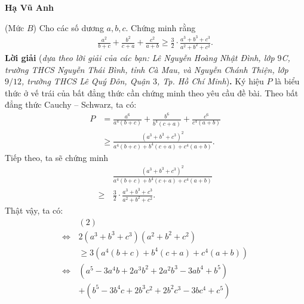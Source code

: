 \begin{multicols}{2}
	\begin{flushright}
		\textbf{\color{thachthuctoanhoc}Hạ Vũ Anh}
	\end{flushright}
	{}
	(Mức $B$) Cho các số dương $a, b, c$. Chứng minh rằng
	\begin{align*}
		\frac{{{a^2}}}{{b + c}} + \frac{{{b^2}}}{{c + a}} + \frac{{{c^2}}}{{a + b}} \ge \frac{3}{2} \cdot \frac{{{a^3} + {b^3} + {c^3}}}{{{a^2} + {b^2} + {c^2}}}.
	\end{align*}
	\textbf{\color{thachthuctoanhoc}Lời giải} (\textit{dựa theo lời giải của các bạn: Lê Nguyễn Hoàng Nhật Đình, lớp $9$C, trường THCS Nguyễn Thái Bình, tỉnh Cà Mau, và Nguyễn Chánh Thiện, lớp $9/12$, trường THCS Lê Quý Đôn, Quận $3$, Tp. Hồ Chí Minh})\textbf{\color{thachthuctoanhoc}.}
	\vskip 0.05cm
	Ký hiệu $P$ là biểu thức ở vế trái của bất đẳng thức cần chứng minh theo yêu cầu đề bài.
	\vskip 0.05cm
	Theo bất đẳng thức Cauchy -- Schwarz, ta có:
	\begin{align*}
		P &= \frac{{{a^6}}}{{{a^4}\left( {b + c} \right)}} + \frac{{{b^6}}}{{{b^4}\left( {c + a} \right)}} + \frac{{{c^6}}}{{{c^4}\left( {a + b} \right)}} \\
		&\ge \frac{{{{\left( {{a^3} \!+\! {b^3} \!+\! {c^3}} \right)}^2}}}{{{a^4}\left(\! {b \!+\! c} \!\right) \!+\! {b^4}\left(\! {c\! + \!a}\! \right) \!+\! {c^4}\left(\! {a \!+\! b} \!\right)}}. \tag{$1$}
	\end{align*}
	Tiếp theo, ta sẽ chứng minh
	\begin{align*}
		&\frac{{{{\left( {{a^3} + {b^3} + {c^3}} \right)}^2}}}{{{a^4}\left( {b + c} \right) + {b^4}\left( {c + a} \right) + {c^4}\left( {a + b} \right)}} \\
		\ge \,&\frac{3}{2} \cdot \frac{{{a^3} + {b^3} + {c^3}}}{{{a^2} + {b^2} + {c^2}}}. \tag{$2$}
	\end{align*}
	Thật vậy, ta có:
	\begin{align*}
			&\left( 2 \right) \\
			\Leftrightarrow \,&2\left( {{a^3} + {b^3} + {c^3}} \right)\left( {{a^2} + {b^2} + {c^2}} \right) \\
			&\ge 3\left(\! {{a^4}\left( {b \!+\! c} \!\right) +\! {b^4}\left(\! {c \!+\! a} \!\right) \!+\! {c^4}\left(\! {a \!+\! b} \!\right)} \!\right)\\
			 \Leftrightarrow &\left( {{a^5} \!-\! 3{a^4}b \!+\! 2{a^3}{b^2} \!+\! 2{a^2}{b^3} \!-\! 3a{b^4} \!+\! {b^5}} \right) \\
			 &+ \left(\! {{b^5} \!-\! 3{b^4}c \!+\! 2{b^3}{c^2} \!+\! 2{b^2}{c^3} \!-\! 3b{c^4} \!+\! {c^5}}\! \right)\\

\end{align*}
\end{multicols}
